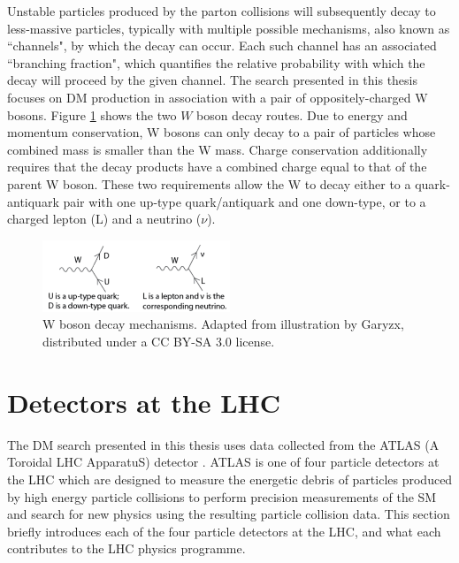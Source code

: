 Unstable particles produced by the parton collisions will subsequently decay to less-massive particles, typically with multiple possible mechanisms, also known as ``channels", by which the decay can occur. Each such channel has an associated ``branching fraction", which quantifies the relative probability with which the decay will proceed by the given channel. The search presented in this thesis focuses on DM production in association with a pair of oppositely-charged W bosons. Figure \ref{fig:W_decays} shows the two $W$ boson decay routes. Due to energy and momentum conservation, W bosons can only decay to a pair of particles whose combined mass is smaller than the W mass. Charge conservation additionally requires that the decay products have a combined charge equal to that of the parent W boson. These two requirements allow the W to decay either to a quark-antiquark pair with one up-type quark/antiquark and one down-type, or to a charged lepton (L) and a neutrino ($\nu$).

\begin{figure}[H]
	\centering
	\includegraphics[width=0.5\textwidth]{Figures/3/W_decays.png}
	\caption[]{W boson decay mechanisms. Adapted from illustration by Garyzx, distributed under a CC BY-SA 3.0 license.}
	\label{fig:W_decays}
\end{figure}

\section{Detectors at the LHC}

The DM search presented in this thesis uses data collected from the ATLAS (A Toroidal LHC ApparatuS) detector \cite{atlas}. ATLAS is one of four particle detectors at the LHC which are designed to measure the energetic debris of particles produced by high energy particle collisions to perform precision measurements of the SM and search for new physics using the resulting particle collision data. This section briefly introduces each of the four particle detectors at the LHC, and what each contributes to the LHC physics programme.

